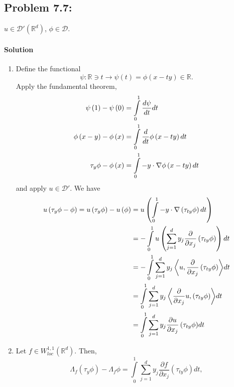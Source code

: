 \documentclass[letterpaper,twoside,11pt]{article}
\theoremstyle{mystyle}
\newcommand{\R}{{\mathbb R}}
\begin{document}
\subsection*{Problem 7.7:}
$u \in \mathcal D'\left( \R^d \right)$, $\phi \in \mathcal D$. 
\paragraph*{Solution}
\begin{enumerate}
  \item Define the functional 
  \[\psi:\R\ni t \to \psi(t) = \phi(x-ty) \in \R.\]
  Apply the fundamental theorem, 
  \begin{align*}
    \psi \left( 1 \right) - \psi \left( 0 \right) &= \int\limits_0^1 {\frac{{d\psi }}{{dt}}dt}  \hfill \\
    \phi \left( {x - y} \right) - \phi \left( x \right) &= \int\limits_0^1 {\frac{d}{{dt}}\phi \left( {x - ty} \right)dt}  \hfill \\
    \tau_y\phi - \phi \left( x \right) &= \int\limits_0^1 { - y \cdot \nabla \phi \left( {x - ty} \right)dt} 
  \end{align*}
  and apply $u \in \mathcal D'$. We have 
  \begin{align*}
    u\left( {{\tau _y}\phi  - \phi } \right) = u\left( {{\tau _y}\phi } \right) - u\left( \phi  \right) &= u\left( {\int\limits_0^1 { - y \cdot \nabla \left( {{\tau _{ty}}\phi } \right)dt} } \right) \hfill \\
     &=  - \int\limits_0^1 {u\left( {\sum\limits_{j = 1}^d {{y_j}\frac{\partial }{{\partial {x_j}}}\left( {{\tau _{ty}}\phi } \right)} } \right)dt}  \hfill \\
     &=  - \int\limits_0^1 {\sum\limits_{j = 1}^d {{y_j}\left\langle {u,\frac{\partial }{{\partial {x_j}}}\left( {{\tau _{ty}}\phi } \right)} \right\rangle } dt}  \hfill \\
     &= \int\limits_0^1 {\sum\limits_{j = 1}^d {{y_j}\left\langle {\frac{\partial }{{\partial {x_j}}}u,\left( {{\tau _{ty}}\phi } \right)} \right\rangle } dt}  \hfill \\
     &= \int\limits_0^1 {\sum\limits_{j = 1}^d {{y_j}\frac{{\partial u}}{{\partial {x_j}}}\left( {{\tau _{ty}}\phi } \right)} dt} 
    \end{align*}
    \item Let $f \in W^{1,1}_{loc} \left( \R^d \right)$. Then, 
    \[{\Lambda _f}\left( {{\tau _y}\phi } \right) - {\Lambda _f}\phi  = \int\limits_0^1 {\sum\limits_{j = 1}^d {{y_j}\frac{{\partial f}}{{\partial {x_j}}}\left( {{\tau _{ty}}\phi } \right)} dt} ,\]

\end{enumerate}
\end{document}
